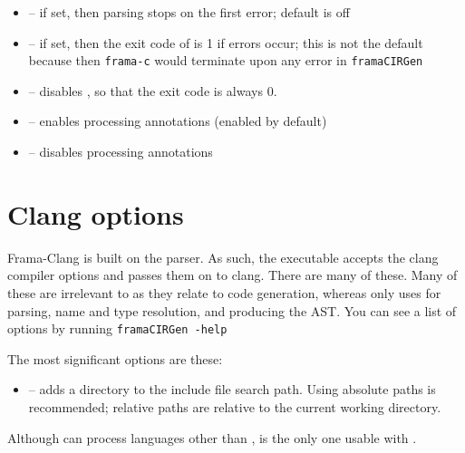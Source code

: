 \begin{itemize}
	\item {} -- if set, then parsing stops on the first error; default is off
	\item {} -- if set, then the exit code of \irg is 1 if errors occur; this is not the default because then \lstinline|frama-c| would terminate upon
	any error in \lstinline|framaCIRGen|
	\item {} -- disables , so that the exit code is always 0.

	\item {} -- enables processing \acslpp annotations (enabled by default)
	\item {} -- disables processing \acslpp annotations
	
\end{itemize}

\section{Clang options}

Frama-Clang is built on the \clang \cpp parser. 
As such, the \irg executable accepts the clang
compiler options and passes them on to clang. There are many of these.
Many of these are irrelevant to \fcl as they relate to 
code generation, whereas \fcl only uses \clang for parsing, name
and type resolution, and producing the AST.
You can see a list of options by running 
\lstinline|framaCIRGen -help|

The most significant \cl options are these:
\begin{itemize}
	\item {} -- adds a directory to the include file search path. Using absolute paths is recommended; relative paths are relative to the current working directory.
\end{itemize}

Although \clang can process languages other than \cpp, \cpp is the only one usable with \fclang.

